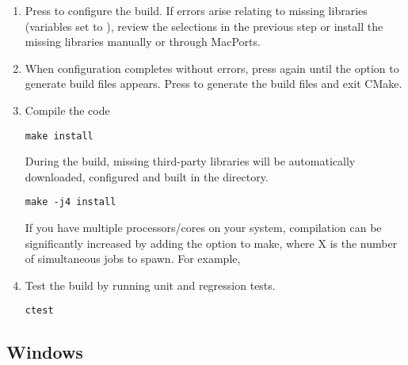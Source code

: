 \begin{enumerate}
    \item Press  to configure the build. If errors arise relating to
        missing libraries (variables set to ), review the 
         selections in the previous
    step or install the missing libraries manually or through MacPorts. 
    
    \item When configuration completes without errors, press  again
    until the option  to generate build files appears. Press 
    to generate the build files and exit CMake.
    
    \item Compile the code
    \begin{lstlisting}[style=BashInputStyle]
        make install
    \end{lstlisting}
    During the build, missing third-party libraries will be automatically
    downloaded, configured and built in the \nekpp {} directory.
    
    \newsavebox\installationMacTip
    \begin{lrbox}{\installationMacTip}\begin{minipage}{0.8\linewidth}
    \begin{lstlisting}[style=BashInputStyle]
    make -j4 install
    \end{lstlisting}
    \end{minipage}
    \end{lrbox}
    
    \begin{tipbox}
    If you have multiple processors/cores on your system, compilation can be
    significantly increased by adding the  option to make, where X is
    the number of simultaneous jobs to spawn. For example,
    \noindent\usebox\installationMacTip
    \end{tipbox}
    
    \item Test the build by running unit and regression tests.
    \begin{lstlisting}[style=BashInputStyle]
    ctest
    \end{lstlisting}
\end{enumerate}

\subsection{Windows}

